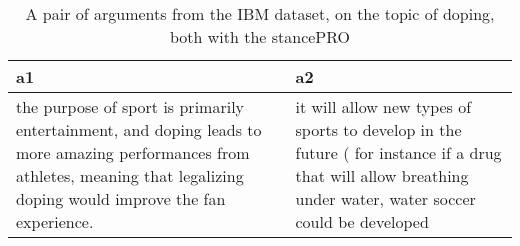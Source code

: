 \begin{table}
\centering
\caption{A pair of arguments from the IBM dataset, on the topic of doping, both with the stancePRO}
\begin{tabular}{p{6cm}|p{6cm}}
\toprule
                                                                                                                                                                             a1 &                                                                                                                                                          a2 \\
\midrule
 the purpose of sport is primarily entertainment, and doping leads to more amazing performances from athletes, meaning that legalizing doping would improve the fan experience. &  it will allow new types of sports to develop in the future ( for instance if a drug that will allow breathing under water, water soccer could be developed \\
\bottomrule
\end{tabular}
\end{table}
